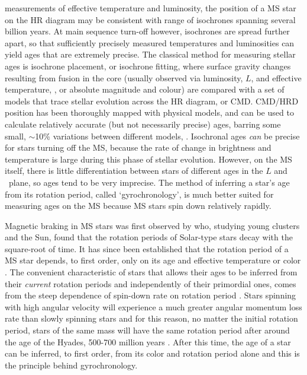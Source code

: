 measurements of effective temperature and luminosity, the position of a MS
star on the HR diagram may be consistent with range of isochrones spanning
several billion years.
At main sequence turn-off however, isochrones are spread further apart, so
that sufficiently precisely measured temperatures and luminosities can yield
ages that are extremely precise.
The classical method for measuring stellar ages is isochrone placement, or
isochrone fitting, where surface gravity changes resulting from fusion in the
core (usually observed via luminosity, $L$, and effective temperature, \teff,
or absolute magnitude and colour) are compared with a set of models that trace
stellar evolution across the HR diagram, or CMD.
CMD/HRD position has been thoroughly mapped with physical models, and can be
used to calculate relatively accurate (but not necessarily precise) ages,
barring some small, $\sim$10\% variations between different models,
\citep[\eg][]{yi2001, dotter2008, dotter2016}.
Isochronal ages {\it can} be precise for stars turning off the MS, because the
rate of change in brightness and temperature is large during this phase of
stellar evolution.
However, on the MS itself, there is little differentiation between stars of
different ages in the $L$ and \teff\ plane, so ages tend to be very imprecise.
The method of inferring a star's age from its rotation period, called
`gyrochronology', is much better suited for measuring ages on the MS because
MS stars spin down relatively rapidly.

Magnetic braking in MS stars was first observed by \citet{skumanich1972} who,
studying young clusters and the Sun, found that the rotation periods of
Solar-type stars decay with the square-root of time.
It has since been established that the rotation period of a MS star depends,
to first order, only on its age and effective temperature or color
\citep[\eg][]{barnes2003}.
The convenient characteristic of stars that allows their ages to be inferred
from their {\it current} rotation periods and independently of their
primordial ones, comes from the steep dependence of spin-down rate on rotation
period \citep{kawaler1989}.
Stars spinning with high angular velocity will experience a much greater
angular momentum loss rate than slowly spinning stars and for this reason, no
matter the initial rotation period, stars of the same mass will have the same
rotation period after around the age of the Hyades, 500-700 million years
\citep{irwin2009}.
After this time, the age of a star can be inferred, to first order, from its
color and rotation period alone and this is the principle behind
gyrochronology.

